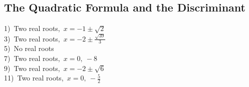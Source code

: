\documentclass[12pt]{book}
\theoremstyle{definition}
\begin{document}
\subsection*{The Quadratic Formula and the Discriminant}

\begin{multicols}{2}
  1)~Two real roots,~$x=-1\pm\sqrt{2}$\\
  3)~Two real roots,~$x=-2\pm\frac{\sqrt{39}}{3}$\\
  5)~No real roots\\
  7)~Two real roots,~$x=0,~-8$\\
  9)~Two real roots,~$x=-2\pm\sqrt{6}$\\
  11)~Two real roots,~$x=0,~-\frac{5}{2}$
\end{multicols}

\end{document}
